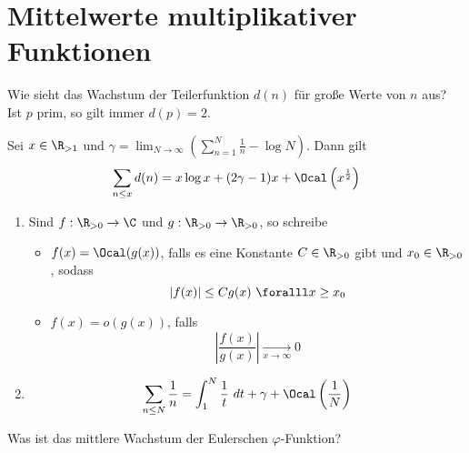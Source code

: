 \section{Mittelwerte multiplikativer Funktionen}

\begin{frage*}
	Wie sieht das Wachstum der Teilerfunktion $d(n)$ für große Werte von $n$ aus?\\
	Ist $p$ prim, so gilt immer $d(p)=2$.
\end{frage*}

\begin{thm}\autolabel
	Sei $x \in \R_{> 1}$ und $\gamma = \lim_{N \to \infty} \left( \sum_{n=1}^N \frac{1}{n} - \log N \right)$. Dann gilt
	\[ \sum_{n\leq x} d(n) = x \log x + (2\gamma - 1)x + \Ocal \left( x^{\frac{1}{2}} \right) \]
\end{thm}

\begin{rem*}
	\begin{enumerate}[label={\roman*})]
		\item Sind $f: \R_{>0} \to \C$ und $g: \R_{>0} \to \R_{>0}$, so schreibe
			\begin{itemize}
				\item $f(x) = \Ocal(g(x))$, falls es eine Konstante $C \in \R_{>0}$ gibt und $x_0 \in \R_{>0}$, sodass
					\[ |f(x)| \leq C g(x) \ \foralll x \geq x_0 \]
				\item $f(x) = o(g(x))$, falls 
					\[ \left| \frac{f(x)}{g(x)} \right| \underset{x \to \infty}{\longrightarrow} 0 \]
			\end{itemize}
		\item \[ \sum_{n \leq N} \frac{1}{n} = \int_{1}^{N} \frac{1}{t} \ dt + \gamma + \Ocal \left( \frac{1}{N} \right) \]
	\end{enumerate}
\end{rem*}

\begin{frage*}
	Was ist das mittlere Wachstum der Eulerschen $\varphi$-Funktion?
\end{frage*}

